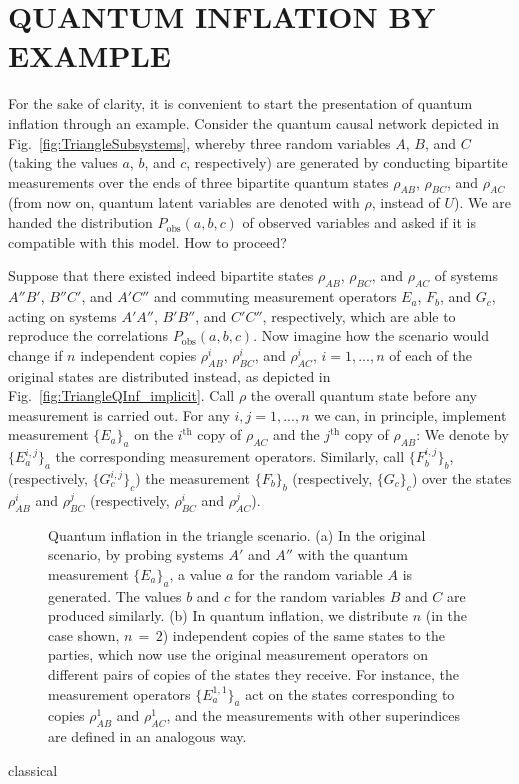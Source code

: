\documentclass[superscriptaddress,aps,prx,nofootinbib,twocolumn,twoside,reprint,letterpaper,longbibliography]{revtex4-2}
\begin{document}
\section{QUANTUM INFLATION BY EXAMPLE}\label{sec:simple}
For the sake of clarity, it is convenient to start the presentation of quantum inflation through an example.
Consider the quantum causal network depicted in Fig.~\ref{fig:TriangleSubsystems}, whereby three random variables $A$, $B$, and $C$ (taking the values $a$, $b$, and $c$, respectively) are generated by conducting bipartite measurements over the ends of three bipartite quantum states $\rho_{AB}$, $\rho_{BC}$, and $\rho_{AC}$ (from now on, quantum latent variables are denoted with $\rho$, instead of $U$).
We are handed the distribution $P_\text{obs}(a,b,c)$ of observed variables and asked if it is compatible with this model.
How to proceed?

Suppose that there existed indeed bipartite states $\rho_{AB}$, $\rho_{BC}$, and $\rho_{AC}$ of systems $A''B'$, $B''C'$, and $A'C''$ and commuting measurement operators $E_a$, $F_b$, and $G_c$, acting on systems $A'A''$, $B'B''$, and $C'C''$, respectively, which are able to reproduce the correlations $P_\text{obs}(a,b,c)$.
Now imagine how the scenario would change if $n$ independent copies $\rho_{AB}^i$, $\rho_{BC}^i$, and $\rho_{AC}^i$, \mbox{$i=1,...,n$} of each of the original states are distributed instead, as depicted in Fig.~\ref{fig:TriangleQInf_implicit}.
Call $\rho$ the overall quantum state before any measurement is carried out.
For any $i,j=1,...,n$ we can, in principle, implement measurement $\{E_a\}_a$ on the $i^\text{th}$ copy of $\rho_{AC}$ and the $j^\text{th}$ copy of $\rho_{AB}$: We denote by $\{E^{i,j}_a\}_a$ the corresponding measurement operators.
Similarly, call $\{F^{i,j}_b\}_b$, (respectively, $\{G^{i,j}_c\}_c$) the measurement $\{F_b\}_b$ (respectively, $\{G_c\}_c$) over the states $\rho_{AB}^i$ and $\rho_{BC}^j$ (respectively, $\rho_{BC}^i$ and $\rho_{AC}^j$).

\begin{figure}[b]
  \centering
  \hfill
  \hfill
  \hfill
  \caption[]{Quantum inflation in the triangle scenario. (a) In the original scenario, by probing systems $A'$ and $A''$ with the quantum measurement $\{E_a\}_a$, a value $a$ for the random variable $A$ is generated. The values $b$ and $c$ for the random variables $B$ and $C$ are produced similarly.
  (b) In quantum inflation, we distribute $n$ (in the case shown, $n\,{=}\,2$) independent copies of the same states to the parties, which now use the original measurement operators on different pairs of copies of the states they receive. For instance, the measurement operators $\{E_a^{1,1}\}_a$ act on the states corresponding to copies $\rho_{AB}^1$ and $\rho_{AC}^1$, and the measurements with other superindices are defined in an analogous way.}
  \label{fig:quantum_inflation}
\end{figure}classical
\end{document}
